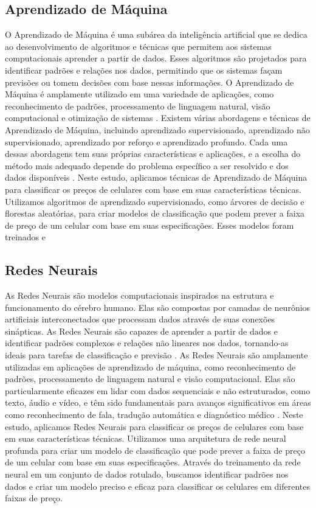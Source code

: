 \documentclass[conference]{IEEEtran}
\begin{document}
\subsection{Aprendizado de Máquina}
O Aprendizado de Máquina é uma subárea da inteligência artificial que se
dedica ao desenvolvimento de algoritmos e técnicas que permitem aos sistemas
computacionais aprender a partir de dados. Esses algoritmos são projetados para
identificar padrões e relações nos dados, permitindo que os sistemas façam
previsões ou tomem decisões com base nessas informações. O Aprendizado de
Máquina é amplamente utilizado em uma variedade de aplicações, como reconhecimento
de padrões, processamento de linguagem natural, visão computacional e
otimização de sistemas \cite{Alpaydin2020}.
Existem várias abordagens e técnicas de Aprendizado de Máquina, incluindo
aprendizado supervisionado, aprendizado não supervisionado, aprendizado por
reforço e aprendizado profundo. Cada uma dessas abordagens tem suas próprias
características e aplicações, e a escolha do método mais adequado depende do
problema específico a ser resolvido e dos dados disponíveis \cite{Bishop2006}.
Neste estudo, aplicamos técnicas de Aprendizado de Máquina para classificar os
preços de celulares com base em suas características técnicas. Utilizamos
algoritmos de aprendizado supervisionado, como árvores de decisão e florestas
aleatórias, para criar modelos de classificação que podem prever a faixa de preço
de um celular com base em suas especificações. Esses modelos foram treinados e

\subsection{Redes Neurais}
As Redes Neurais são modelos computacionais inspirados na estrutura e
funcionamento do cérebro humano. Elas são compostas por camadas de neurônios
artificiais interconectados que processam dados através de suas conexões
sinápticas. As Redes Neurais são capazes de aprender a partir de dados e
identificar padrões complexos e relações não lineares nos dados, tornando-as
ideais para tarefas de classificação e previsão \cite{Haykin2009}.
As Redes Neurais são amplamente utilizadas em aplicações de aprendizado de
máquina, como reconhecimento de padrões, processamento de linguagem natural e
visão computacional. Elas são particularmente eficazes em lidar com dados
sequenciais e não estruturados, como texto, áudio e vídeo, e têm sido
fundamentais para avanços significativos em áreas como reconhecimento de fala,
tradução automática e diagnóstico médico \cite{LeCun2015}.
Neste estudo, aplicamos Redes Neurais para classificar os preços de celulares com
base em suas características técnicas. Utilizamos uma arquitetura de rede neural
profunda para criar um modelo de classificação que pode prever a faixa de preço
de um celular com base em suas especificações. Através do treinamento da rede
neural em um conjunto de dados rotulado, buscamos identificar padrões nos dados e
criar um modelo preciso e eficaz para classificar os celulares em diferentes
faixas de preço.
\end{document}
